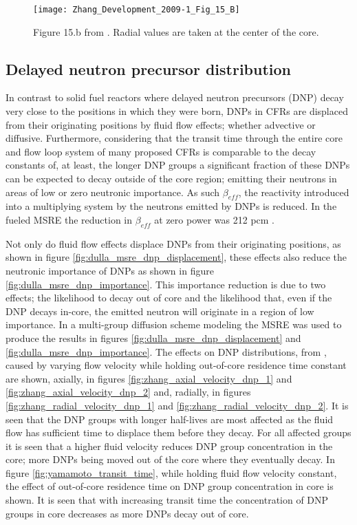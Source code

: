 \documentclass[review]{elsarticle}
\begin{document}
\begin{figure}[h]
   \centering
   \texttt{[image: Zhang\_Development\_2009-1\_Fig\_15\_B]}
   \caption{Figure 15.b from \cite{zhang_development_2009-1}.
               Radial 
               values are taken at the center of the core.}
   \label{fig:zhang_radial_velocity_flux}
\end{figure}

\subsection{Delayed neutron precursor distribution} \label{ssec:dnpd}
In contrast to solid fuel reactors where delayed neutron precursors (DNP) decay
 very close to the positions in which they were born, DNPs in CFRs are displaced
 from their originating positions by fluid flow effects; whether advective or
 diffusive. Furthermore, considering that the transit time through the entire
 core and flow loop system of many proposed CFRs is comparable to the decay
 constants of, 
 at least, the longer DNP groups a significant fraction of these DNPs can be
expected to decay outside of the core region; emitting their neutrons in areas
of low or zero neutronic importance. As such $\beta_{eff}$, the reactivity
 introduced into a multiplying system by the neutrons emitted by DNPs
is reduced. In the  fueled MSRE the reduction in $\beta_{eff}$ at
zero power was 212 pcm \cite{delpech_benchmark_2003}.

\par Not only do fluid flow effects displace DNPs from their originating positions,
as shown in figure \ref{fig:dulla_msre_dnp_displacement}, these effects also
reduce the neutronic importance of DNPs as shown in figure
\ref{fig:dulla_msre_dnp_importance}. This importance reduction is due to two
effects; the likelihood to decay out of core and the likelihood that, even if the
DNP decays in-core, the emitted neutron will originate in a region of low
importance. In \cite{dulla_models_2005} a multi-group
diffusion scheme modeling the MSRE was used to produce the results in figures
\ref{fig:dulla_msre_dnp_displacement} and \ref{fig:dulla_msre_dnp_importance}.
The effects on DNP distributions, from \cite{zhang_development_2009-1}, caused
by varying flow velocity while holding out-of-core residence time constant are
shown, axially, in figures \ref{fig:zhang_axial_velocity_dnp_1} and 
\ref{fig:zhang_axial_velocity_dnp_2} and, radially, in figures
\ref{fig:zhang_radial_velocity_dnp_1} and \ref{fig:zhang_radial_velocity_dnp_2}.
It is seen that the DNP groups with longer half-lives are most affected as the
fluid flow has sufficient time to displace them before they decay. For all
affected groups it is seen that a higher fluid velocity reduces DNP group
concentration in the core; more DNPs being moved out of the core where they
eventually decay. In figure \ref{fig:yamamoto_transit_time}, while holding fluid flow velocity constant, the effect of
out-of-core residence time on DNP group concentration
in core is shown. It is seen that with increasing transit time the concentration
of DNP groups in core decreases as more DNPs decay out of core.   
\end{document}
